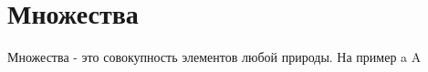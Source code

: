 
\title{}
\author{nils-nm}
\date{сентябрь 1, 2023}



\maketitle
\tableofcontents

\begin{abstract}
	Преподаватель - Шишкина Светлана Ивановна \newline
	Здесь я пишу лекции по математическому анализу
	варианты билетов вопросы по подготовке можно найти на электронном портале ФН-2
\end{abstract}

\section{Множества}
\begin{множества}
	Множества - это совокупность элементов любой природы.
	На пример a \in A 
\end{множества}


\newpage
\listoftables
\listoffigures
\printbibliography

\newpage
\appendix



